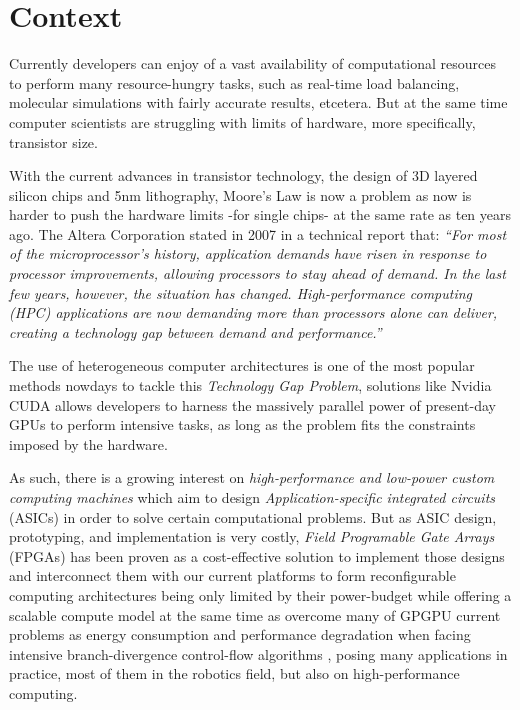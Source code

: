 \section{Context}
Currently developers can enjoy of a vast availability of computational resources to
perform many resource-hungry tasks, such as real-time load balancing, molecular
simulations with fairly accurate results, etcetera. But at the same time computer
scientists are struggling with limits of hardware, more specifically, transistor size.

With the current advances in transistor technology, the design of 3D layered silicon 
chips and 5nm lithography, Moore's Law is now a problem as now is harder to push the 
hardware limits -for single chips- at the same rate as ten years ago\cite{7478302,EETIMES1}.
The Altera Corporation stated in 2007 in a technical report that: \emph{``For most of 
the microprocessor's history, application demands have risen in response to 
processor improvements, allowing processors to stay ahead of demand. In the last 
few years, however, the situation has changed. High-performance computing (HPC) 
applications are now demanding more than processors alone can deliver, creating a 
technology gap between demand and performance.''}\cite{ALTERA_Accel_fpga}

The use of heterogeneous computer architectures is one of the most popular methods
nowdays to tackle this \emph{Technology Gap Problem}, solutions like Nvidia CUDA
\cite{NVIDIA_volta} allows developers to harness the massively parallel power of present-day
GPUs to perform intensive tasks, as long as the problem fits the constraints imposed
by the hardware. 

As such, there is a growing interest on \emph{high-performance and low-power custom computing 
machines} which aim to design \emph{Application-specific integrated circuits} (ASICs) in order 
to solve  certain computational problems. But as ASIC design, prototyping, and implementation is
very costly, \emph{Field Programable Gate Arrays} (FPGAs) has been proven as a cost-effective 
solution to implement those designs and interconnect them with our current platforms to form 
reconfigurable computing architectures \cite{ReconfigurableComputing, 6589302,
Compton00anintroduction} being only limited by their power-budget while offering a scalable
compute model at the same time as overcome many of GPGPU current problems as energy consumption
and performance degradation when facing intensive branch-divergence control-flow algorithms 
\cite{6376229}, posing many applications in practice, most of them in the robotics field, but
also on high-performance computing. 

